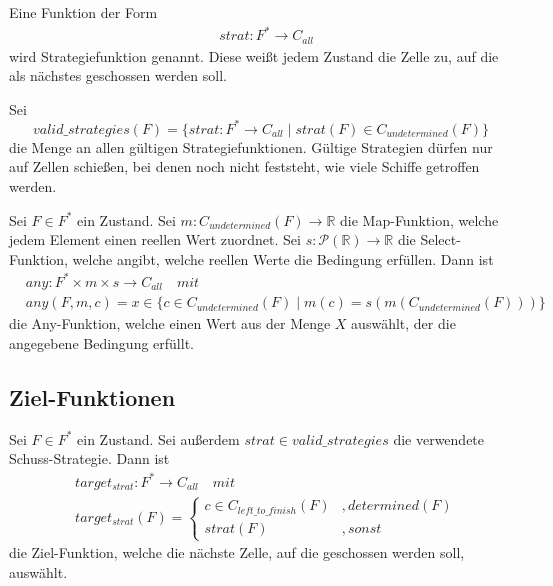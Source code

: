 \documentclass[a4paper,12pt]{llncs}
\newcommand{\R}{{\mathbb{R}}}
\numberwithin{equation}{section}
\begin{document}
\begin{definition}
Eine Funktion der Form
\begin{align}
&strat:F^* \rightarrow C_{all}\nonumber
\end{align}
wird Strategiefunktion genannt. Diese weißt jedem Zustand die Zelle zu, auf die als nächstes geschossen werden soll.
\end{definition}

\begin{definition}
Sei
\[
valid\_strategies(F)=\{ strat:F^* \rightarrow C_{all} \mid strat(F) \in C_{undetermined}(F)  \}
\]
die Menge an allen gültigen Strategiefunktionen. Gültige Strategien dürfen nur auf Zellen schießen, bei denen noch nicht feststeht, wie viele Schiffe getroffen werden.
\end{definition}

\begin{definition}
Sei $F\in F^*$ ein Zustand.
Sei $m:C_{undetermined}(F) \rightarrow \R$ die Map-Funktion, welche jedem Element einen reellen Wert zuordnet.
Sei $s:\mathcal{P}(\R) \rightarrow \R$ die Select-Funktion, welche angibt, welche reellen Werte die Bedingung erfüllen.
Dann ist
\begin{align}
&any:F^* \times m \times s \rightarrow C_{all} \quad mit \nonumber\\
&any(F, m, c)=x \in \{c \in C_{undetermined}(F) \mid m(c) = s(m(C_{undetermined}(F)))\}
\nonumber
\end{align}
die Any-Funktion, welche einen Wert aus der Menge $X$ auswählt, der die angegebene Bedingung erfüllt.
\end{definition}

\subsection{Ziel-Funktionen}

\begin{definition}
Sei $F\in F^*$ ein Zustand.
Sei außerdem $strat \in valid\_strategies$ die verwendete Schuss-Strategie.
Dann ist
\begin{align}
&target_{strat}:F^*\rightarrow C_{all} \quad mit \nonumber\\
&target_{strat}(F)=
\begin{cases}
c \in C_{left\_to\_finish}(F)&, determined(F) \\
strat(F)&, sonst
\end{cases}
\nonumber
\end{align}
die Ziel-Funktion, welche die nächste Zelle, auf die geschossen werden soll, auswählt.
\end{definition}
\end{document}
